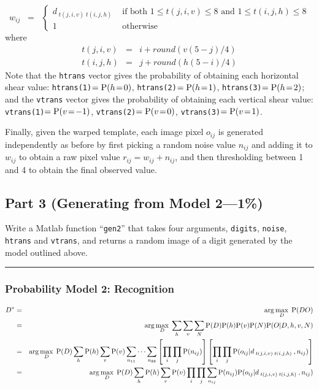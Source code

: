 \documentclass[12pt]{article}
\begin{document}
\[
w_{ij} \;\;=\;\;\left\{
\begin{array}{ll}
d_{\;t(j,i,v)\;t(i,j,h)}
& \mbox{ if both $1\leq t(j,i,v)\leq 8$ and $1\leq t(i,j,h)\leq 8$}
\\[2ex]
1 & \mbox{ otherwise}
\end{array}
\right.
\]
where
%
\begin{eqnarray*}
t(j,i,v) & = & i+round(v(5-j)/4)
\\
t(i,j,h) & = & j+round(h(5-i)/4)
\end{eqnarray*}
%
Note that the
{\tt htrans} vector gives the probability of obtaining each 
horizontal shear value:
{\tt htrans(1)}$={\rm P}(h\!=\!0)$,
{\tt htrans(2)}$={\rm P}(h\!=\!1)$,
{\tt htrans(3)}$={\rm P}(h\!=\!2)$;
and
the {\tt vtrans} vector gives the probability of obtaining each 
vertical shear value:
{\tt vtrans(1)}$={\rm P}(v\!=\!-1)$,
{\tt vtrans(2)}$={\rm P}(v\!=\!0)$,
{\tt vtrans(3)}$={\rm P}(v\!=\!1)$.

Finally, given the warped template, each image pixel $o_{ij}$ is generated 
independently as before by
first picking a random noise value $n_{ij}$ and adding it to
$w_{ij}$ to obtain a raw pixel value $r_{ij}=w_{ij}+n_{ij}$,
and then thresholding between 1 and 4 to obtain the final observed value.
 
\subsection*{Part 3 \rm(Generating from Model 2---1\%)}
 
Write a Matlab function ``{\tt gen2}'' that takes four arguments,
{\tt digits}, {\tt noise}, {\tt htrans} and {\tt vtrans}, 
and returns a random image of a 
digit generated by the model outlined above.


\vspace*{1\baselineskip}

\hrule

\subsubsection*{Probability Model 2: Recognition}

\begin{eqnarray*}
D^*
& = & \arg\max_D \; {\rm P}(DO)
\\
& = & \arg\max_D \; \sum_h\sum_v\sum_N {\rm P}(D){\rm P}(h){\rm P}(v){\rm P}(N){\rm P}(O|D,h,v,N)
\\
& = & \arg\max_D \; {\rm P}(D)\sum_h{\rm P}(h)\sum_v{\rm P}(v)\sum_{n_{11}}\cdots\sum_{n_{88}} 
\left[\prod_i\prod_j{\rm P}(n_{ij})\right]
\left[\prod_i\prod_j {\rm P}(o_{ij}|d_{\;t(j,i,v)\;t(i,j,h)\;},n_{ij}) \right]
\\
& = & \arg\max_D \; {\rm P}(D)\sum_h{\rm P}(h)\sum_v{\rm P}(v)
\prod_i\prod_j \sum_{n_{ij}} {\rm P}(n_{ij}){\rm P}(o_{ij}|d_{\;t(j,i,v)\;t(i,j,h)\;},n_{ij})
\end{eqnarray*}
\end{document}
